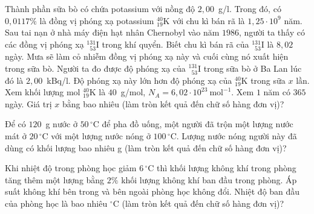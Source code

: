 	\begin{ex}%
		Thành phần sữa bò có chứa potassium với nồng độ $2{,}00$~g/l. Trong đó, có $0{,}0117\%$ là đồng vị phóng xạ potassium ${}^{40}_{19}\text{K}$ với chu kì bán rã là $1{,}25\cdot 10^9$ năm. Sau tai nạn ở nhà máy điện hạt nhân Chernobyl vào năm $1986$, người ta thấy có các đồng vị phóng xạ ${}^{131}_{\phantom{1}53}\text{I}$ trong khí quyển. Biết chu kì bán rã của ${}^{131}_{\phantom{1}53}\text{I}$ là $8{,}02$ ngày. Mưa sẽ làm cỏ nhiễm đồng vị phóng xạ này và cuối cùng nó xuất hiện trong sữa bò. Người ta đo được độ phóng xạ của ${}^{131}_{\phantom{1}53}\text{I}$ trong sữa bò ở Ba Lan lúc đó là $2{,}00$~kBq/l. Độ phóng xạ này lớn hơn độ phóng xạ của ${}^{40}_{19}\text{K}$ trong sữa $x$ lần. Xem khối lượng mol ${}^{40}_{19}\text{K}$ là $40$~g/mol, $N_A=6{,}02\cdot 10^{23}~\text{mol}^{-1}$. Xem $1$ năm có $365$ ngày. Giá trị $x$ bằng bao nhiêu (làm tròn kết quả đến chữ số hàng đơn vị)?
		\par
	\end{ex}

	\begin{ex}%
		Để có $120$~g nước ở $50\,^\circ\text{C}$ để pha đồ uống, một người đã trộn một lượng nước mát ở $20\,^\circ\text{C}$ với một lượng nước nóng ở $100\,^\circ\text{C}$. Lượng nước nóng người này đã dùng có khối lượng bao nhiêu g (làm tròn kết quả đến chữ số hàng đơn vị)?
		\par
	\end{ex}

	\begin{ex}%
		Khi nhiệt độ trong phòng học giảm $6\,^\circ\text{C}$ thì khối lượng không khí trong phòng tăng thêm một lượng bằng $2\%$ khối lượng không khí ban đầu trong phòng. Áp suất không khí bên trong và bên ngoài phòng học không đổi. Nhiệt độ ban đầu của phòng học là bao nhiêu $^\circ$C (làm tròn kết quả đến chữ số hàng đơn vị)?
		\par
	\end{ex}

